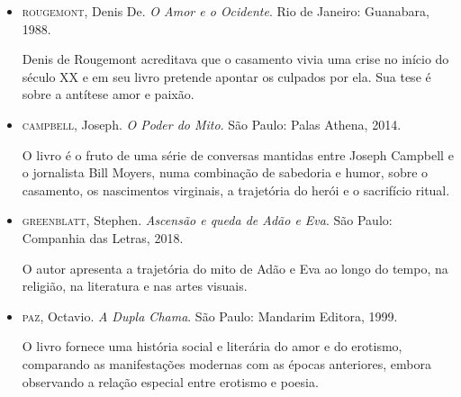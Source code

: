 \documentclass{extarticle}
\begin{document}
\begin{itemize}
\item\textsc{rougemont}, Denis De. \textit{O Amor e o Ocidente}. Rio de Janeiro:
Guanabara, 1988.

Denis de Rougemont acreditava que o casamento vivia uma crise no início
do século XX e em seu livro pretende apontar os culpados por ela. Sua
tese é sobre a antítese amor e paixão.

\item\textsc{campbell}, Joseph. \textit{O Poder do Mito}. São Paulo: Palas Athena,
2014.

O livro é o fruto de uma série de conversas mantidas entre Joseph
Campbell e o jornalista Bill Moyers, numa combinação de sabedoria e
humor, sobre o casamento, os nascimentos virginais, a trajetória do
herói e o sacrifício ritual.

\item\textsc{greenblatt}, Stephen. \textit{Ascensão e queda de Adão e Eva}. São Paulo: Companhia das Letras, 2018.

O autor apresenta a trajetória do mito de Adão e Eva ao longo do tempo,
na religião, na literatura e nas artes visuais.

\item\textsc{paz}, Octavio. \textit{A Dupla Chama}. São Paulo: Mandarim Editora, 1999.

O livro fornece uma história social e literária do amor e do erotismo,
comparando as manifestações modernas com as épocas anteriores, embora
observando a relação especial entre erotismo e poesia.
\end{itemize}
\end{document}
